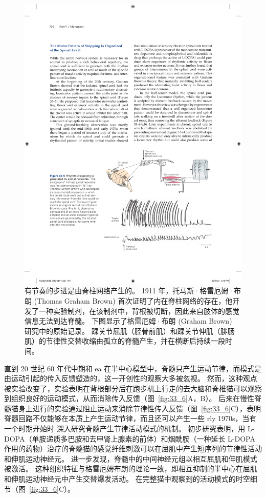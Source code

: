 \begin{figure}[htbp]
	\centering
	\includegraphics[width=0.7\linewidth]{chap33/fig_33_5}
	\caption{有节奏的步进是由脊柱网络产生的。
	1911 年，托马斯·格雷厄姆·布朗 (Thomas Graham Brown) 首次证明了内在脊柱网络的存在，他开发了一种实验制剂，在该制剂中，背根被切断，因此来自肢体的感觉信息无法到达脊髓。
	下图显示了格雷厄姆·布朗 (Graham Brown) 研究中的原始记录。
	踝关节屈肌（胫骨前肌）和踝关节伸肌（腓肠肌）的节律性交替收缩由孤立的脊髓产生，并在横断后持续一段时间。}
	\label{fig:33_5}
\end{figure}


直到 20 世纪 60 年代中期和 ea 在半中心模型中，脊髓只产生运动节律，而模式是由运动引起的传入反馈塑造的，这一开创性的观察大多被忽视。 
然而，这种观点被实验改变了，实验表明在背根部分后在跑步机上行走的去大脑和脊椎猫可以观察到组织良好的运动模式，从而消除传入反馈（图~\ref{fig:33_6}A，B）。 
后来在慢性脊髓猫身上进行的实验通过阻止运动来消除节律性传入反馈（图~\ref{fig:33_6}C），表明脊髓回路不仅能够在本质上产生运动节律，而且还可以产生一些 rly 1970s，当有一个时期开始时 深入研究脊髓产生节律活动模式的机制。
初步研究表明，用 L-DOPA（单胺递质多巴胺和去甲肾上腺素的前体）和烟酰胺（一种延长 L-DOPA 作用的药物）治疗的脊髓猫的感觉纤维刺激可以在屈肌中产生短序列的节律性活动 和伸肌运动神经元。
进一步发现，脊髓中的中间神经元组以相互屈肌和伸肌模式被激活。
这种组织特征与格雷厄姆布朗的理论一致，即相互抑制的半中心在屈肌和伸肌运动神经元中产生交替爆发活动。
在完整猫中观察到的活动模式的时空细节（图~\ref{fig:33_6}C）。


